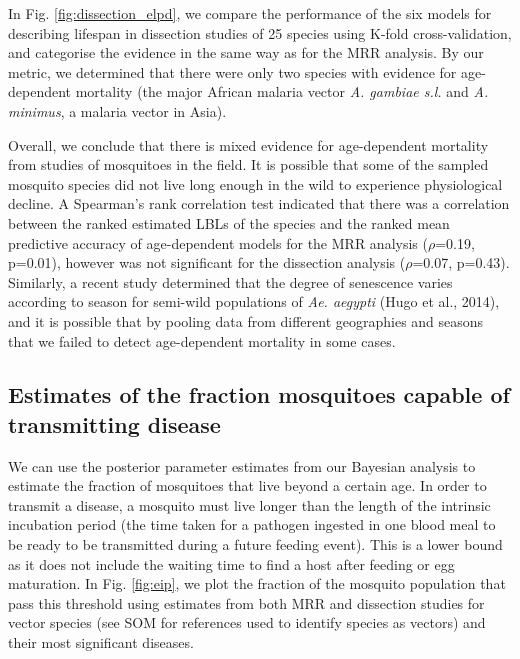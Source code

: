 \documentclass[]{article}
\begin{document}
In Fig. \ref{fig:dissection_elpd}, we compare the performance of the six models for describing
lifespan in dissection studies of 25 species using K-fold
cross-validation, and categorise the evidence in the same way as for the
MRR analysis. By our metric, we determined that there were only two
species with evidence for age-dependent mortality (the major African
malaria vector \emph{A. gambiae s.l.} and \emph{A. minimus}, a malaria
vector in Asia).

Overall, we conclude that there is mixed evidence for age-dependent
mortality from studies of mosquitoes in the field. It is possible that
some of the sampled mosquito species did not live long enough in the
wild to experience physiological decline. A Spearman's rank correlation
test indicated that there was a correlation between the ranked estimated
LBLs of the species and the ranked mean predictive accuracy of
age-dependent models for the MRR analysis ($\rho$=0.19, p=0.01), however was
not significant for the dissection analysis ($\rho$=0.07, p=0.43). Similarly,
a recent study determined that the degree of senescence varies according
to season for semi-wild populations of \emph{Ae. aegypti} (Hugo et al.,
2014), and it is possible that by pooling data from different
geographies and seasons that we failed to detect age-dependent mortality
in some cases.

\subsection{Estimates of the fraction mosquitoes capable of transmitting
disease}\label{estimates-of-the-fraction-mosquitoes-capable-of-transmitting-disease}

We can use the posterior parameter estimates from our Bayesian analysis
to estimate the fraction of mosquitoes that live beyond a certain age.
In order to transmit a disease, a mosquito must live longer than the
length of the intrinsic incubation period (the time taken for a pathogen
ingested in one blood meal to be ready to be transmitted during a future
feeding event). This is a lower bound as it does not include the waiting
time to find a host after feeding or egg maturation. In Fig. \ref{fig:eip}, we plot
the fraction of the mosquito population that pass this threshold using
estimates from both MRR and dissection studies for vector species (see
SOM for references used to identify species as vectors) and their most
significant diseases.
\end{document}
